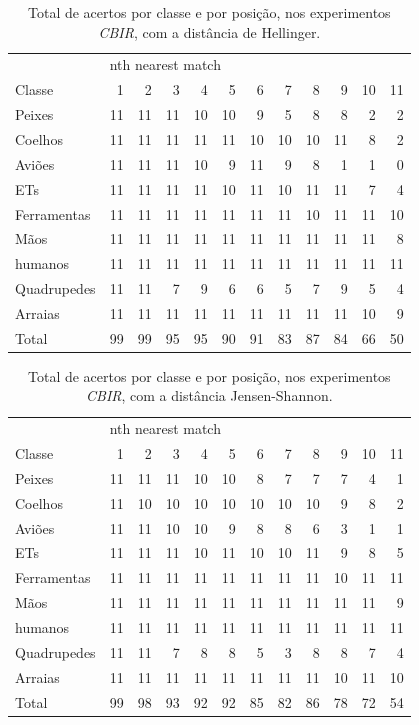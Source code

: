 \begin{table}
\centering
\caption{\label{tab:KimiaHellinger} Total de acertos por classe e por posição, nos experimentos \emph{CBIR}, com a distância de Hellinger.}
\begin{tabular}{l| r r r r r r r r r r r}
\hline
&\multicolumn{11}{l}{nth nearest match} \\
\cline{2-12}
Classe&1&2&3&4&5&6&7&8&9&10&11 \\
 \hline
Peixes&11&11&11&10&10&9&5&8&8&2&2\\
Coelhos&11&11&11&11&11&10&10&10&11&8&2\\ 
Aviões&11&11&11&10&9&11&9&8&1&1&0\\
ETs&11&11&11&11&10&11&10&11&11&7&4\\
Ferramentas&11&11&11&11&11&11&11&10&11&11& 10\\
Mãos&11&11&11&11&11&11&11&11&11&11&8\\
humanos&11&11&11&11&11&11&11&11&11&11&11\\
Quadrupedes&11&11&7&9&6&6&5&7&9&5&4\\
Arraias&11&11&11&11&11&11&11&11&11&10&9\\
\hline
Total&99&99&95&95&90&91&83&87&84&66&50\\
\hline
\end{tabular}
\end{table}

\begin{table}
\centering
\caption{\label{tab:KimiaJensen-Shannon} Total de acertos por classe e por posição, nos experimentos \emph{CBIR}, com a distância Jensen-Shannon.}
\begin{tabular}{l| r r r r r r r r r r r}
\hline
&\multicolumn{11}{l}{nth nearest match} \\
\cline{2-12}
Classe&1&2&3&4&5&6&7&8&9&10&11 \\
 \hline
Peixes&11&11&11&10&10&8&7&7&7&4&1\\
Coelhos&11&10&10&10&10&10&10&10&9&8&2\\ 
Aviões&11&11&10&10&9&8&8&6&3&1&1\\
ETs&11&11&11&10&11&10&10&11&9&8&5\\
Ferramentas&11&11&11&11&11&11&11&11&10&11& 11\\
Mãos&11&11&11&11&11&11&11&11&11&11&9\\
humanos&11&11&11&11&11&11&11&11&11&11&11\\
Quadrupedes&11&11&7&8&8&5&3&8&8&7&4\\
Arraias&11&11&11&11&11&11&11&11&10&11&10\\
\hline
Total&99&98&93&92&92&85&82&86&78&72&54\\
\hline
\end{tabular}
\end{table}

